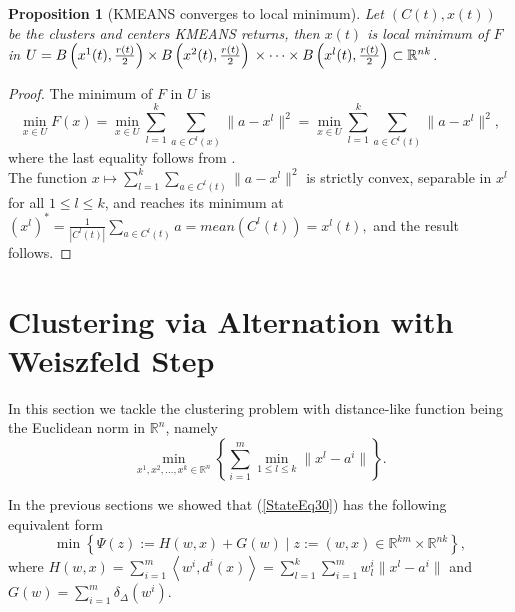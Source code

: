 \documentclass[11pt]{article}
\numberwithin{equation}{section}
\newtheorem{proposition}{Proposition}[section]
\begin{document}
\begin{proposition}[KMEANS converges to local minimum]
Let $(C(t), x(t))$ be the clusters and centers KMEANS returns, then $x(t)$ is local minimum of $F$ in $U = B\left( x^1(t),\frac{r(t)}{2}\right) \times  B\left( x^2(t),\frac{r(t)}{2}\right) \\ \times \cdots \times B\left( x^l(t),\frac{r(t)}{2} \right) \subset \mathbb{R}^{nk}$.
\end{proposition}

\begin{proof}
The minimum of $F$ in $U$ is
\begin{equation*}
\min\limits_{x \in U} F(x) = \min\limits_{x \in U} \sum\limits_{l=1}^{k} \sum\limits_{a \in C^l(x)} \|a - x^l \|^2 = \min\limits_{x \in U} \sum\limits_{l=1}^{k} \sum\limits_{a \in C^l(t)} \|a - x^l \|^2 ,
\end{equation*}
where the last equality follows from .\\
The function $x \mapsto \sum\limits_{l=1}^{k} \sum\limits_{a \in C^l(t)} \|a - x^l \|^2$ is strictly convex, separable in $x^l$ for all $1 \leq l \leq k$, and reaches its minimum at $\left( x^l \right)^{*} = \frac{1}{\left| C^l(t) \right|} \sum\limits_{a \in C^l(t)} a = mean(C^l(t)) = x^l(t),$ and the result follows.
\end{proof}

\section{Clustering via Alternation with Weiszfeld Step}

In this section we tackle the clustering problem with distance-like function being the Euclidean norm in $\mathbb{R}^n$, namely
\begin{equation}
	\min_{x^1, x^2, \ldots, x^k \in \mathbb{R}^n} \left\lbrace \sum\limits_{i=1}^{m} \min\limits_{1 \leq l \leq k} \|x^l - a^i\| \right\rbrace . \label{StateEq30}
\end{equation}

In the previous sections we showed that (\ref{StateEq30}) has the following equivalent form
\begin{equation*}
	\min \left\lbrace \Psi(z) := H(w,x) + G(w) \mid z := (w,x) \in \mathbb{R}^{km} \times \mathbb{R}^{nk} \right\rbrace ,
\end{equation*}
where $	H(w,x) = \sum\limits_{i=1}^{m} \left\langle w^i , d^i(x) \right\rangle
	= \sum\limits_{l=1}^{k} \sum\limits_{i=1}^{m} w^i_l \| x^l - a^i \| $ and $G(w) = \sum\limits_{i=1}^{m} \delta_{\Delta}(w^i)$.
\end{document}
